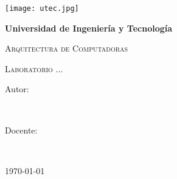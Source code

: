 
	\begin{titlepage}
		\centering
		
		
		{\texttt{[image: utec.jpg]}\par}
		\vspace{0.25cm}
		{\bfseries\LARGE Universidad de Ingeniería y Tecnología \par}
		{\scshape\Large Arquitectura de Computadoras \par}
		\vspace{0.5cm}
		{\scshape\Huge Laboratorio ...\par}
		{\itshape\Large  \par}
		\vfill
		{\Large Autor: \par}
		{\Large \\ \par}
		\vfill
		\vspace{0.25cm}
		{\Large Docente: \par}
		{\Large \\ \par}
		\vspace{0.5cm}
		
		{\Large \today \par}
	\end{titlepage}

